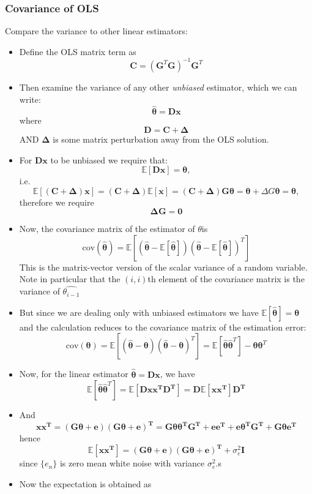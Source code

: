\documentclass[12pt]{article}
\newcommand{\sigd}{\sigma^2}
\newcommand{\mexp}{\mathbb{E}}
\newcommand{\proc}[1]{\{ #1_n\}}
\newcommand{\thetab}{\boldsymbol{\theta}}
\newcommand{\cov}{\textrm{cov}}
\newcommand{\prethe}{\hat{\thetab}}
\begin{document}
\subsubsection{Covariance of OLS}
Compare the variance to other linear estimators:
\begin{itemize}
    \item Define the OLS matrix term as 
    \[
    \mathbf{C = } (\mathbf{G}^T\mathbf{G})^{-1}\mathbf{G}^T
    \]
    \item Then examine the variance of any other \textit{unbiased} estimator, which we can write:
    \[
    \hat{\thetab}  = \mathbf{Dx}
    \]
    where 
    \[
    \mathbf{D = C + \Delta}
    \]
    AND $\mathbf{\Delta}$ is some matrix perturbation away from the OLS solution.
    \item For $\mathbf{Dx}$ to be unbiased we require that:
    \[
    \mexp[\mathbf{Dx}] = \thetab,
    \]
    i.e. 
    \[
    \mathbf{\mexp[(C+\Delta)x] = (C + \Delta)\mexp[x] = (C + \Delta)G \thetab } = \thetab + \Delta G \thetab = \thetab,
    \]
    therefore we require
    \[
    \mathbf{\Delta G = 0}
    \]
    \item Now, the covariance matrix of the estimator of $\theta$is 
    \[
    \cov(\prethe) = \mexp[(\prethe - \mexp[\prethe])  (\prethe - \mexp[\prethe])^T]
    \]
    This is the matrix-vector version of the scalar variance of a random variable. Note in particular that the $(i,i)$th element of the covariance matrix is the variance of $\hat{\theta_{i-1}}$
    \item But since we are dealing only with unbiased estimators we have $\mexp[\prethe] =\thetab$ and the calculation reduces to the covariance matrix of the estimation error:
    \[
    \cov(\thetab) = \mexp[(\prethe - \thetab)(\prethe - \thetab)^T] = \mexp[\prethe\prethe^T] - \thetab\thetab^T
    \]
    \item Now, for the linear estimator $\prethe = \mathbf{Dx}$, we have
    \[
    \mexp[\prethe\prethe^T] = \mexp[\mathbf{Dxx^TD^T}] = \mathbf{D \mexp[xx^T]D^T}
    \]
    \item And 
    \[
    \mathbf{xx^T} = \mathbf{(G\thetab + e)(G\thetab + e)^T} = \mathbf{G\thetab \thetab^T G^T  + ee^T + e\thetab^T G^T + G\thetab e^T}
    \]
    hence
    \[
    \mexp[\mathbf{xx^T}] = \mathbf{(G\thetab + e)(G\thetab + e)^T} + \sigd_e \mathbf{I}
    \]
    since $\proc{e}$ is zero mean white noise with variance $\sigd_e$.s
    \item Now the expectation is obtained as 
    \begin{align*}

\end{align*}
\end{itemize}
\end{document}
